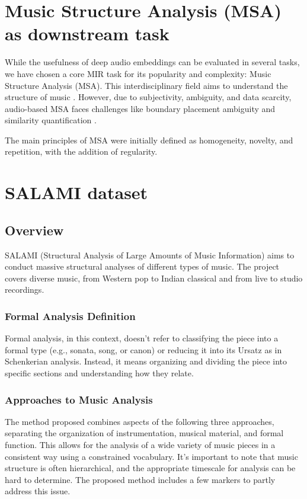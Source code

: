 \section{Music Structure Analysis (MSA) as downstream task}

While the usefulness of deep audio embeddings can be evaluated in several tasks, we have chosen a core MIR task for its popularity and complexity: Music Structure Analysis (MSA). This interdisciplinary field aims to understand the structure of music \cite{Nieto2020Audio-BasedApplications}. However, due to subjectivity, ambiguity, and data scarcity, audio-based MSA faces challenges like boundary placement ambiguity and similarity quantification \cite{NietoPerceptualMusic}. 

The main principles of MSA were initially defined as homogeneity, novelty, and repetition, with the addition of regularity. 

\section{SALAMI dataset}
\subsection{Overview}

SALAMI (Structural Analysis of Large Amounts of Music Information) \cite{Smith2011DESIGNANNOTATIONS} aims to conduct massive structural analyses of different types of music. The project covers diverse music, from Western pop to Indian classical and from live to studio recordings.

\subsubsection{Formal Analysis Definition}
Formal analysis, in this context, doesn't refer to classifying the piece into a formal type (e.g., sonata, song, or canon) or reducing it into its Ursatz as in Schenkerian analysis. Instead, it means organizing and dividing the piece into specific sections and understanding how they relate.


\subsubsection{Approaches to Music Analysis}

The method proposed combines aspects of the following three approaches, separating the organization of instrumentation, musical material, and formal function. This allows for the analysis of a wide variety of music pieces in a consistent way using a constrained vocabulary. It's important to note that music structure is often hierarchical, and the appropriate timescale for analysis can be hard to determine. The proposed method includes a few markers to partly address this issue.

